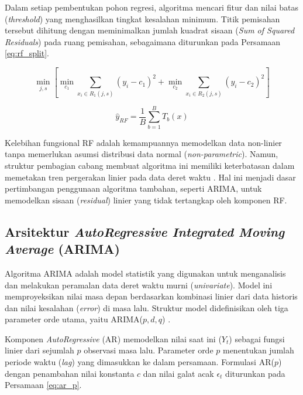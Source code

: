 Dalam setiap pembentukan pohon regresi, algoritma mencari fitur dan nilai batas (\textit{threshold}) yang menghasilkan tingkat kesalahan minimum. Titik pemisahan tersebut dihitung dengan meminimalkan jumlah kuadrat sisaan (\textit{Sum of Squared Residuals}) pada ruang pemisahan, sebagaimana diturunkan pada Persamaan \ref{eq:rf_split}.

\begin{equation}
\min_{j,s} \left[ \min_{c_1} \sum_{x_i \in R_1(j,s)} (y_i - c_1)^2 + \min_{c_2} \sum_{x_i \in R_2(j,s)} (y_i - c_2)^2 \right]
\label{eq:rf_split}
\end{equation}

\newpage

\begin{equation}
\hat{y}_{RF} = \frac{1}{B} \sum_{b=1}^{B} T_b(x)
\label{eq:rf_math}
\end{equation}

Kelebihan fungsional RF adalah kemampuannya memodelkan data non-linier tanpa memerlukan asumsi distribusi data normal (\textit{non-parametric}). Namun, struktur pembagian cabang membuat algoritma ini memiliki keterbatasan dalam memetakan tren pergerakan linier pada data deret waktu \autocite{yenkikar2025explainable}. Hal ini menjadi dasar pertimbangan penggunaan algoritma tambahan, seperti ARIMA, untuk memodelkan sisaan (\textit{residual}) linier yang tidak tertangkap oleh komponen RF.

\subsection{Arsitektur \textit{AutoRegressive Integrated Moving Average} (ARIMA)}

Algoritma ARIMA adalah model statistik yang digunakan untuk menganalisis dan melakukan peramalan data deret waktu murni (\textit{univariate}). Model ini memproyeksikan nilai masa depan berdasarkan kombinasi linier dari data historis dan nilai kesalahan (\textit{error}) di masa lalu. Struktur model didefinisikan oleh tiga parameter orde utama, yaitu ARIMA($p, d, q$) \autocite{yunis2024hybridization}.

Komponen \textit{AutoRegressive} (AR) memodelkan nilai saat ini ($Y_t$) sebagai fungsi linier dari sejumlah $p$ observasi masa lalu. Parameter orde $p$ menentukan jumlah periode waktu (\textit{lag}) yang dimasukkan ke dalam persamaan. Formulasi AR($p$) dengan penambahan nilai konstanta $c$ dan nilai galat acak $\epsilon_t$ diturunkan pada Persamaan \ref{eq:ar_p}.

